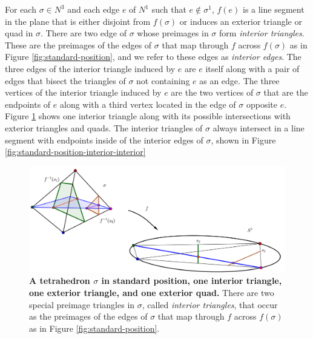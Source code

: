 For each $\sigma\in N^3$ and each edge $e$ of $N^1$ such that $e\notin\sigma^1$, $f(e)$ is a line segment in the plane that is either disjoint from $f(\sigma)$ or induces an exterior triangle or quad in $\sigma$.
There are two edge of $\sigma$ whose preimages in $\sigma$ form \emph{interior triangles}.
These are the preimages of the edges of $\sigma$ that map through $f$ across $f(\sigma)$ as in Figure \ref{fig:standard-position}, and we refer to these edges as \emph{interior edges}.
The three edges of the interior triangle induced by $e$ are $e$ itself along with a pair of edges that bisect the triangles of $\sigma$ not containing $e$ as an edge.
The three vertices of the interior triangle induced by $e$ are the two vertices of $\sigma$ that are the endpoints of $e$ along with a third vertex located in the edge of $\sigma$ opposite $e$.
Figure \ref{fig:standard-position-interior-exterior} shows one interior triangle along with its possible intersections with exterior triangles and quads.
The interior triangles of $\sigma$ always intersect in a line segment with endpoints inside of the interior edges of $\sigma$, shown in Figure \ref{fig:standard-position-interior-interior}

\begin{figure}[h!]
	\centering
	\includegraphics[width=\textwidth]{figures/standard-position-interior-exterior.png}
	\caption{
		\textbf{A tetrahedron $\sigma$ in standard position, one interior triangle, one exterior triangle, and one exterior quad.}
		There are two special preimage triangles in $\sigma$, called \emph{interior triangles}, that occur as the preimages of the edges of $\sigma$ that map through $f$ across $f(\sigma)$ as in Figure \ref{fig:standard-position}.
	}
	\label{fig:standard-position-interior-exterior}
\end{figure}

